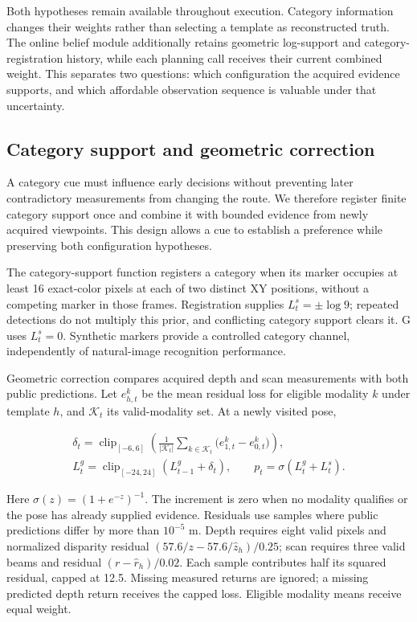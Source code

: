 Both hypotheses remain available throughout execution. Category information changes their weights rather than selecting a template as reconstructed truth. The online belief module additionally retains geometric log-support and category-registration history, while each planning call receives their current combined weight. This separates two questions: which configuration the acquired evidence supports, and which affordable observation sequence is valuable under that uncertainty.

\hypertarget{category-support-and-geometric-correction}{%
\subsection{Category support and geometric correction}\label{category-support-and-geometric-correction}}

A category cue must influence early decisions without preventing later contradictory measurements from changing the route. We therefore register finite category support once and combine it with bounded evidence from newly acquired viewpoints. This design allows a cue to establish a preference while preserving both configuration hypotheses.

The category-support function registers a category when its marker occupies at least 16 exact-color pixels at each of two distinct XY positions, without a competing marker in those frames. Registration supplies \(L_t^s=\pm\log9\); repeated detections do not multiply this prior, and conflicting category support clears it. G uses \(L_t^s=0\). Synthetic markers provide a controlled category channel, independently of natural-image recognition performance.

Geometric correction compares acquired depth and scan measurements with both public predictions. Let \(e_{h,t}^{k}\) be the mean residual loss for eligible modality \(k\) under template \(h\), and \(\mathcal K_t\) its valid-modality set. At a newly visited pose,

\[
\begin{aligned}
\delta_t=\operatorname{clip}_{[-6,6]}
\left(\frac{1}{|\mathcal K_t|}\sum_{k\in\mathcal K_t}
\bigl(e_{1,t}^{k}-e_{0,t}^{k}\bigr)\right),\\
L_t^g=\operatorname{clip}_{[-24,24]}(L_{t-1}^g+\delta_t),\qquad
p_t=\sigma(L_t^g+L_t^s).
\end{aligned}
\]

Here \(\sigma(z)=(1+e^{-z})^{-1}\). The increment is zero when no modality qualifies or the pose has already supplied evidence. Residuals use samples where public predictions differ by more than \(10^{-5}\) m. Depth requires eight valid pixels and normalized disparity residual \((57.6/z-57.6/\widehat z_h)/0.25\); scan requires three valid beams and residual \((r-\widehat r_h)/0.02\). Each sample contributes half its squared residual, capped at 12.5. Missing measured returns are ignored; a missing predicted depth return receives the capped loss. Eligible modality means receive equal weight.

